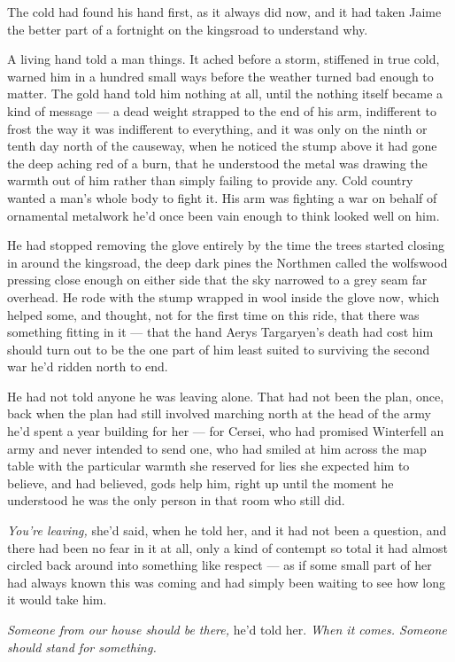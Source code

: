 The cold had found his hand first, as it always did now, and it had taken Jaime the better part of a fortnight on the kingsroad to understand why.

A living hand told a man things. It ached before a storm, stiffened in true cold, warned him in a hundred small ways before the weather turned bad enough to matter. The gold hand told him nothing at all, until the nothing itself became a kind of message — a dead weight strapped to the end of his arm, indifferent to frost the way it was indifferent to everything, and it was only on the ninth or tenth day north of the causeway, when he noticed the stump above it had gone the deep aching red of a burn, that he understood the metal was drawing the warmth out of him rather than simply failing to provide any. Cold country wanted a man’s whole body to fight it. His arm was fighting a war on behalf of ornamental metalwork he’d once been vain enough to think looked well on him.

He had stopped removing the glove entirely by the time the trees started closing in around the kingsroad, the deep dark pines the Northmen called the wolfswood pressing close enough on either side that the sky narrowed to a grey seam far overhead. He rode with the stump wrapped in wool inside the glove now, which helped some, and thought, not for the first time on this ride, that there was something fitting in it — that the hand Aerys Targaryen’s death had cost him should turn out to be the one part of him least suited to surviving the second war he’d ridden north to end.

He had not told anyone he was leaving alone. That had not been the plan, once, back when the plan had still involved marching north at the head of the army he’d spent a year building for her — for Cersei, who had promised Winterfell an army and never intended to send one, who had smiled at him across the map table with the particular warmth she reserved for lies she expected him to believe, and had believed, gods help him, right up until the moment he understood he was the only person in that room who still did.

\textit{You’re leaving,} she’d said, when he told her, and it had not been a question, and there had been no fear in it at all, only a kind of contempt so total it had almost circled back around into something like respect — as if some small part of her had always known this was coming and had simply been waiting to see how long it would take him.

\textit{Someone from our house should be there,} he’d told her. \textit{When it comes. Someone should stand for something.}

